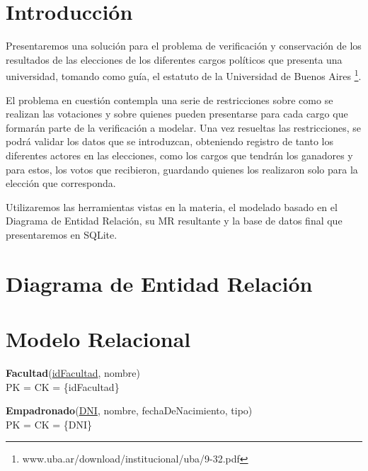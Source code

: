 \documentclass[a4paper, 10pt, twoside]{article}
\begin{document}
\section{Introducción}
Presentaremos una solución para el problema de verificación y conservación de los resultados de las elecciones
de los diferentes cargos políticos que presenta una universidad, tomando como guía, el estatuto de la Universidad
de Buenos Aires \footnote{www.uba.ar/download/institucional/uba/9-32.pdf}.

El problema en cuestión contempla una serie de restricciones sobre como se realizan las votaciones y sobre quienes
pueden presentarse para cada cargo que formarán parte de la verificación a modelar. Una vez resueltas las restricciones,
se podrá validar los datos que se introduzcan, obteniendo registro de tanto los diferentes actores en las elecciones, como
los cargos que tendrán los ganadores y para estos, los votos que recibieron, guardando quienes los realizaron solo para la elección
que corresponda.

Utilizaremos las herramientas vistas en la materia, el modelado basado en el Diagrama de Entidad Relación, su
MR resultante y la base de datos final que presentaremos en SQLite.


\newpage




\section{Diagrama de Entidad Relación}




\section{Modelo Relacional}

\textbf{Facultad}(\underline{idFacultad}, nombre) \\
PK = CK = \{idFacultad\}

\textbf{Empadronado}(\underline{DNI}, nombre, fechaDeNacimiento, tipo) \\
PK = CK = \{DNI\}
\end{document}
